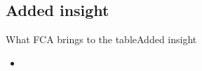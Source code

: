 \subsection{Added insight}
\begin{frame}{What FCA brings to the table}{Added insight}

\begin{minipage}[t]{0.40\linewidth}
  \begin{figure}[ht]
    \centering
  \end{figure}
\end{minipage}
\begin{minipage}{0.59\linewidth}
  \begin{itemize}
    \item 
  \end{itemize}
\end{minipage}

\end{frame}